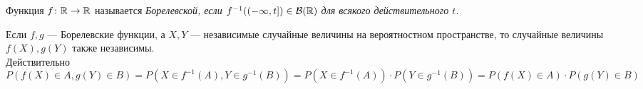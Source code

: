 \begin{comment}
    Обоснование счётной-аддитивности $Q(A)$:\\
    Заметим, что $\{X \in A, Y \in B\} = \{X \in A\} \cap \{Y \in B\}$. Тогда
    \begin{align*}
        Q\left( \bigcup_{k = 1}^{\infty} A_k \right) &=
        \frac{P\left(\left\{
        X \in \bigcup\limits_{k = 1}^{\infty} A_k, Y \in B
        \right\}\right)}{P(Y \in B)} =
        \frac{P\left(\left\{
        X \in \bigcup\limits_{k = 1}^{\infty} A_k\right\} \cap \left\{ Y \in B
        \right\}\right)}{P(Y \in B)} =
        \frac{P\left( \bigcup\limits_{k = 1}^{\infty}
        \{X \in A_k\} \cap \{ Y \in B
        \}\right)}{P(Y \in B)} =\\
        &= \sum\limits_{k = 1}^{\infty} Q(A_k)
    \end{align*}
    В последнем переходе использована счётная аддитивность $P$.
\end{comment}
\begin{definition}
    Функция $f \colon \mathbb{R} \to \mathbb{R}$ называется \it{Борелевской}, если $f^{-1}((-\infty, t]) \in \mathcal{B}(\mathbb{R})$
    для всякого действительного $t$.
\end{definition}
\begin{corollary}
    Если $f, g$ --- Борелевские функции, а $X, Y$ --- независимые случайные величины на вероятностном пространстве,
    то случайные величины $f(X), g(Y)$ также независимы.\\
    Действительно
    \[
        P(f(X) \in A, g(Y) \in B) = P(X \in f^{-1}(A), Y \in g^{-1}(B)) =
        P(X \in f^{-1}(A)) \cdot P(Y \in g^{-1}(B)) = P(f(X) \in A) \cdot P(g(Y) \in B)
    \]
\end{corollary}
